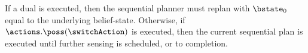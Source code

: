 




If a dual is executed, then the sequential planner must
replan with $\bstate_0$ equal to the underlying
belief-state. Otherwise, if $\actions.\poss(\switchAction)$ is
executed, then the current sequential plan is executed until further
sensing is scheduled, or to completion.






